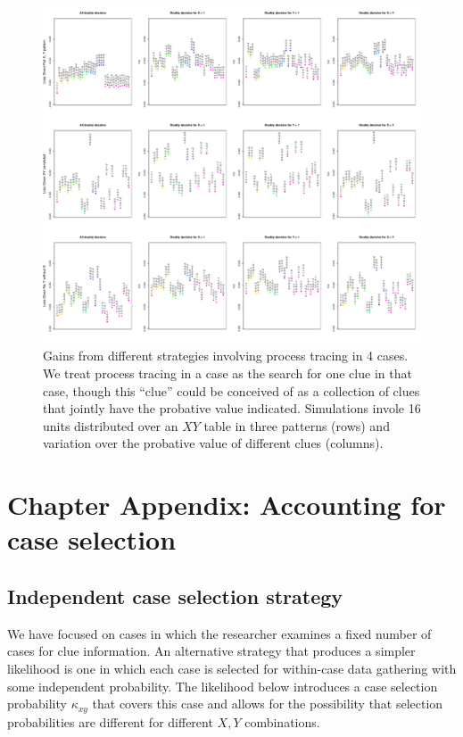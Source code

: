 \documentclass[12pt,]{book}
\begin{document}
\begin{figure}
\centering
\includegraphics{Figures/K4.pdf}
\caption{Gains from different strategies involving process tracing in 4 cases. We treat process tracing in a case as the search for one clue in that case, though this ``clue'' could be conceived of as a collection of clues that jointly have the probative value indicated. Simulations invole 16 units distributed over an \(XY\) table in three patterns (rows) and variation over the probative value of different clues (columns).}
\end{figure}

\hypertarget{chapter-appendix-accounting-for-case-selection}{%
\section{Chapter Appendix: Accounting for case selection}\label{chapter-appendix-accounting-for-case-selection}}

\hypertarget{independent-case-selection-strategy}{%
\subsection{Independent case selection strategy}\label{independent-case-selection-strategy}}

We have focused on cases in which the researcher examines a fixed number of cases for clue information. An alternative strategy that produces a simpler likelihood is one in which each case is selected for within-case data gathering with some independent probability. The likelihood below introduces a case selection probability \(\kappa_{xy}\) that covers this case and allows for the possibility that selection probabilities are different for different \(X,Y\) combinations.
\end{document}
